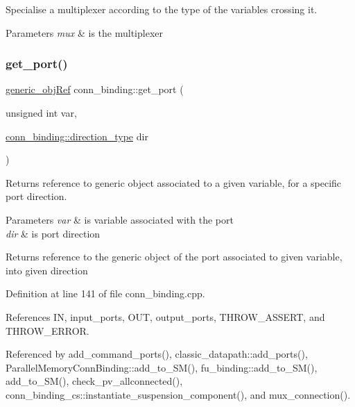 Specialise a multiplexer according to the type of the variables crossing it. 


\begin{DoxyParams}{Parameters}
{\em mux} & is the multiplexer \\
\hline
\end{DoxyParams}
\mbox{\label{classconn__binding_a0a23777374b0ac3c3c9811bbeb2c3137}} 
\subsubsection{\texorpdfstring{get\+\_\+port()}{get\_port()}}
{\footnotesize\ttfamily \hyperlink{generic__obj_8hpp_acb533b2ef8e0fe72e09a04d20904ca81}{generic\+\_\+obj\+Ref} conn\+\_\+binding\+::get\+\_\+port (\begin{DoxyParamCaption}\item[{unsigned int}]{var,  }\item[{\hyperlink{classconn__binding_af1575e7a7dc7acd00fc5c947f413c663}{conn\+\_\+binding\+::direction\+\_\+type}}]{dir }\end{DoxyParamCaption})}



Returns reference to generic object associated to a given variable, for a specific port direction. 


\begin{DoxyParams}{Parameters}
{\em var} & is variable associated with the port \\
\hline
{\em dir} & is port direction \\
\hline
\end{DoxyParams}
\begin{DoxyReturn}{Returns}
reference to the generic object of the port associated to given variable, into given direction 
\end{DoxyReturn}


Definition at line 141 of file conn\+\_\+binding.\+cpp.



References IN, input\+\_\+ports, O\+UT, output\+\_\+ports, T\+H\+R\+O\+W\+\_\+\+A\+S\+S\+E\+RT, and T\+H\+R\+O\+W\+\_\+\+E\+R\+R\+OR.



Referenced by add\+\_\+command\+\_\+ports(), classic\+\_\+datapath\+::add\+\_\+ports(), Parallel\+Memory\+Conn\+Binding\+::add\+\_\+to\+\_\+\+S\+M(), fu\+\_\+binding\+::add\+\_\+to\+\_\+\+S\+M(), add\+\_\+to\+\_\+\+S\+M(), check\+\_\+pv\+\_\+allconnected(), conn\+\_\+binding\+\_\+cs\+::instantiate\+\_\+suspension\+\_\+component(), and mux\+\_\+connection().

